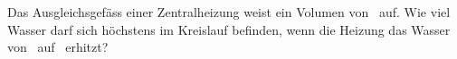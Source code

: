 Das Ausgleichsgefäss einer Zentralheizung weist ein Volumen von \VAgO\ auf. Wie viel Wasser darf sich höchstens im Kreislauf befinden, wenn die Heizung das Wasser von \TAzO\ auf \TBzO\ erhitzt?
